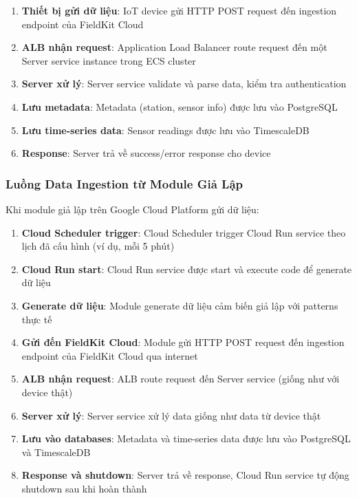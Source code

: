 \begin{enumerate}
    \item \textbf{Thiết bị gửi dữ liệu}: IoT device gửi HTTP POST request đến ingestion endpoint của FieldKit Cloud
    \item \textbf{ALB nhận request}: Application Load Balancer route request đến một Server service instance trong ECS cluster
    \item \textbf{Server xử lý}: Server service validate và parse data, kiểm tra authentication
    \item \textbf{Lưu metadata}: Metadata (station, sensor info) được lưu vào PostgreSQL
    \item \textbf{Lưu time-series data}: Sensor readings được lưu vào TimescaleDB
    \item \textbf{Response}: Server trả về success/error response cho device
\end{enumerate}

\subsubsection{Luồng Data Ingestion từ Module Giả Lập}

Khi module giả lập trên Google Cloud Platform gửi dữ liệu:

\begin{enumerate}
    \item \textbf{Cloud Scheduler trigger}: Cloud Scheduler trigger Cloud Run service theo lịch đã cấu hình (ví dụ, mỗi 5 phút)
    \item \textbf{Cloud Run start}: Cloud Run service được start và execute code để generate dữ liệu
    \item \textbf{Generate dữ liệu}: Module generate dữ liệu cảm biến giả lập với patterns thực tế
    \item \textbf{Gửi đến FieldKit Cloud}: Module gửi HTTP POST request đến ingestion endpoint của FieldKit Cloud qua internet
    \item \textbf{ALB nhận request}: ALB route request đến Server service (giống như với device thật)
    \item \textbf{Server xử lý}: Server service xử lý data giống như data từ device thật
    \item \textbf{Lưu vào databases}: Metadata và time-series data được lưu vào PostgreSQL và TimescaleDB
    \item \textbf{Response và shutdown}: Server trả về response, Cloud Run service tự động shutdown sau khi hoàn thành
\end{enumerate}

